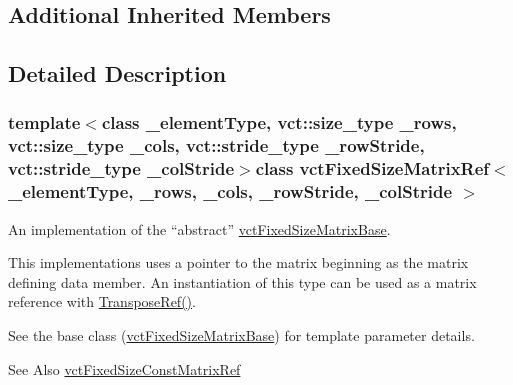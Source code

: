 \subsection*{Additional Inherited Members}


\subsection{Detailed Description}
\subsubsection*{template$<$class \-\_\-element\-Type, vct\-::size\-\_\-type \-\_\-rows, vct\-::size\-\_\-type \-\_\-cols, vct\-::stride\-\_\-type \-\_\-row\-Stride, vct\-::stride\-\_\-type \-\_\-col\-Stride$>$class vct\-Fixed\-Size\-Matrix\-Ref$<$ \-\_\-element\-Type, \-\_\-rows, \-\_\-cols, \-\_\-row\-Stride, \-\_\-col\-Stride $>$}

An implementation of the ``abstract'' \hyperlink{classvct_fixed_size_matrix_base}{vct\-Fixed\-Size\-Matrix\-Base}. 

This implementations uses a pointer to the matrix beginning as the matrix defining data member. An instantiation of this type can be used as a matrix reference with \hyperlink{classvct_fixed_size_matrix_base_a8652991f4652d49f52c33a20e293b355}{Transpose\-Ref()}.

See the base class (\hyperlink{classvct_fixed_size_matrix_base}{vct\-Fixed\-Size\-Matrix\-Base}) for template parameter details.

\begin{DoxySeeAlso}{See Also}
\hyperlink{classvct_fixed_size_const_matrix_ref}{vct\-Fixed\-Size\-Const\-Matrix\-Ref} 
\end{DoxySeeAlso}


